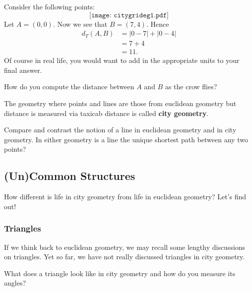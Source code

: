 \documentclass{ximera}
\begin{document}
\begin{example} Consider the following points:
\[
\texttt{[image: citygrideg1.pdf]}
\]
Let $A = (0,0)$. Now we see that $B = (7,4)$. Hence
\begin{align*}
d_T(A,B) &= |0 - 7| + |0-4|\\
&= 7 + 4 \\
&= 11.
\end{align*}
Of course in real life, you would want to add in the appropriate units
to your final answer.
\end{example}

\begin{question} How do you compute the distance between $A$ and $B$ as the crow flies?
\end{question}


\begin{definition}
The geometry where points and lines are those from euclidean geometry
but distance is measured via taxicab distance is called \textbf{city
  geometry}.
\end{definition}

\begin{question} Compare and contrast the notion of a line in euclidean geometry and in city geometry. In either geometry is a line the unique shortest path between any two points?
\end{question}




\subsection*{(Un)Common Structures}

How different is life in city geometry from life in euclidean
geometry? Let's find out!

\subsubsection*{Triangles}

If we think back to euclidean geometry, we
may recall some lengthy discussions on triangles. Yet so far, we have
not really discussed triangles in city geometry.

\begin{question} What does a triangle look like in city geometry and how do you measure its angles? 
\end{question}
\end{document}
